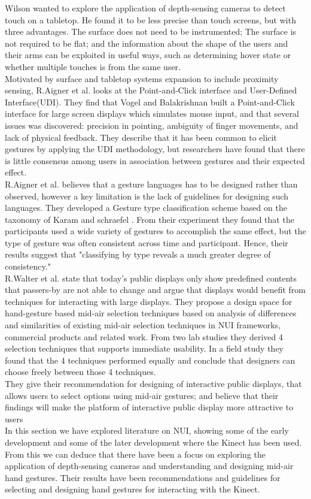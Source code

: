 Wilson \cite{Wilson:2010} wanted to explore the application of depth-sensing cameras to detect touch on a tabletop. He found it to be less precise than touch screens, but with three advantages. The surface does not need to be instrumented; The surface is not required to be flat; and the information about the shape of the users and their arms can be exploited in useful ways, such as determining hover state or whether multiple touches is from the same user. \cite{Wilson:2010}\\


Motivated by surface and tabletop systems expansion to include proximity sensing, R.Aigner et al.\cite{Aigner:2012} looks at the Point-and-Click interface and User-Defined Interface(UDI). They find that Vogel and Balakrishnan \cite{Vogel:2005} built a Point-and-Click interface for large screen displays which simulates mouse input, and that several issues was discovered: precision in pointing, ambiguity of finger movements, and lack of physical feedback. They describe that it has been common to elicit gestures by applying the UDI methodology, but researchers have found that there is little consensus among users in association between gestures and their expected effect.\\
R.Aigner et al.\cite{Aigner:2012} believes that a gesture languages has to be designed rather than observed, however a key limitation is the lack of guidelines for designing such languages.
They developed a Gesture type classification scheme based on the taxonomy of Karam and schraefel .
From their experiment they found that the participants used  a  wide  variety  of  gestures  to accomplish  the  same  effect, but the  type  of  gesture was  often  consistent  across  time and participant. Hence, their results suggest that "classifying by type reveals a much greater degree of consistency." 
\\
R.Walter et al.\cite{Walter:2014} state that today's public displays only show predeﬁned contents that passers-by are not able to change and argue that displays would beneﬁt from techniques for interacting with large displays. They propose a design space for hand-gesture based mid-air selection techniques based on analysis of differences and similarities of existing mid-air selection techniques in NUI frameworks, commercial products and related work. From two lab studies they derived 4 selection techniques that supports immediate usability. In a field study they found that the 4 techniques performed equally and conclude that designers can choose freely between those 4 techniques.\\
They give their recommendation for designing of interactive public displays, that allows users to select options using mid-air gestures; and believe that their findings will make the platform of interactive public display more attractive to users
\\
In this section we have explored literature on NUI, showing some of the early development and some of the later development where the Kinect has been used. From this we can deduce that there have been a focus on exploring the application of depth-sensing cameras and understanding and designing mid-air hand gestures. Their results have been recommendations and guidelines for selecting and designing hand gestures for interacting with the Kinect.
